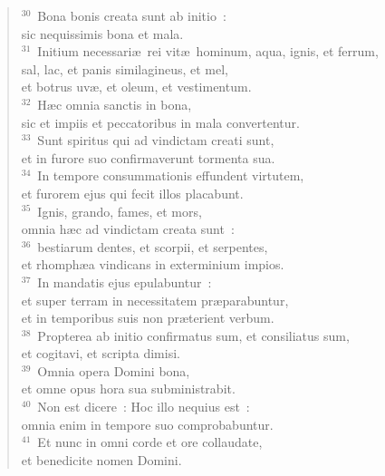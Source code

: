 \begin{verse}
${}^{30}$~Bona bonis creata sunt ab initio~:\\ sic nequissimis bona et mala.\\
${}^{31}$~Initium necessari\ae\ rei vit\ae\ hominum, aqua, ignis, et ferrum,\\ sal, lac, et panis similagineus, et mel,\\ et botrus uv\ae , et oleum, et vestimentum.\\
${}^{32}$~H\ae c omnia sanctis in bona,\\ sic et impiis et peccatoribus in mala convertentur.\\
${}^{33}$~Sunt spiritus qui ad vindictam creati sunt,\\ et in furore suo confirmaverunt tormenta sua.\\
${}^{34}$~In tempore consummationis effundent virtutem,\\ et furorem ejus qui fecit illos placabunt.\\
${}^{35}$~Ignis, grando, fames, et mors,\\ omnia h\ae c ad vindictam creata sunt~:\\
${}^{36}$~bestiarum dentes, et scorpii, et serpentes,\\ et rhomph\ae a vindicans in exterminium impios.\\
${}^{37}$~In mandatis ejus epulabuntur~:\\ et super terram in necessitatem pr\ae parabuntur,\\ et in temporibus suis non pr\ae terient verbum.\\
${}^{38}$~Propterea ab initio confirmatus sum, et consiliatus sum,\\ et cogitavi, et scripta dimisi.\\
${}^{39}$~Omnia opera Domini bona,\\ et omne opus hora sua subministrabit.\\
${}^{40}$~Non est dicere~: Hoc illo nequius est~:\\ omnia enim in tempore suo comprobabuntur.\\
${}^{41}$~Et nunc in omni corde et ore collaudate,\\ et benedicite nomen Domini.\end{verse}


